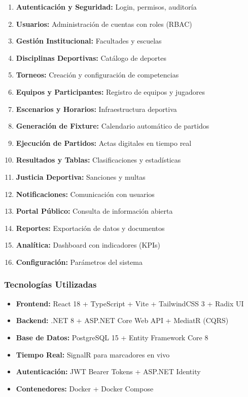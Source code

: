 \documentclass[12pt,a4paper]{article}
\begin{document}
\begin{enumerate}[noitemsep]
    \item \textbf{Autenticación y Seguridad:} Login, permisos, auditoría
    \item \textbf{Usuarios:} Administración de cuentas con roles (RBAC)
    \item \textbf{Gestión Institucional:} Facultades y escuelas
    \item \textbf{Disciplinas Deportivas:} Catálogo de deportes
    \item \textbf{Torneos:} Creación y configuración de competencias
    \item \textbf{Equipos y Participantes:} Registro de equipos y jugadores
    \item \textbf{Escenarios y Horarios:} Infraestructura deportiva
    \item \textbf{Generación de Fixture:} Calendario automático de partidos
    \item \textbf{Ejecución de Partidos:} Actas digitales en tiempo real
    \item \textbf{Resultados y Tablas:} Clasificaciones y estadísticas
    \item \textbf{Justicia Deportiva:} Sanciones y multas
    \item \textbf{Notificaciones:} Comunicación con usuarios
    \item \textbf{Portal Público:} Consulta de información abierta
    \item \textbf{Reportes:} Exportación de datos y documentos
    \item \textbf{Analítica:} Dashboard con indicadores (KPIs)
    \item \textbf{Configuración:} Parámetros del sistema
\end{enumerate}

\subsubsection{Tecnologías Utilizadas}

\begin{itemize}[noitemsep]
    \item \textbf{Frontend:} React 18 + TypeScript + Vite + TailwindCSS 3 + Radix UI
    \item \textbf{Backend:} .NET 8 + ASP.NET Core Web API + MediatR (CQRS)
    \item \textbf{Base de Datos:} PostgreSQL 15 + Entity Framework Core 8
    \item \textbf{Tiempo Real:} SignalR para marcadores en vivo
    \item \textbf{Autenticación:} JWT Bearer Tokens + ASP.NET Identity
    \item \textbf{Contenedores:} Docker + Docker Compose
\end{itemize}
\end{document}
